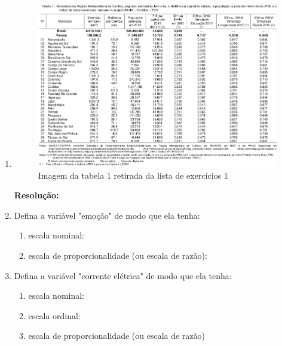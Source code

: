 \begin{enumerate}[label=\emph{\arabic*})]
	\item
	      \begin{figure}[h]
		      \centering
		      \includegraphics[width=\linewidth]{"fig/imagem da tabela 1"}
		      \caption[Imagem da tabela 1]{Imagem da tabela 1 retirada da lista de exercícios 1}
		      \label{fig:imagem-da-tabela-1}
	      \end{figure}

	      \textbf{Resolução:}

	\item Defina a variável "emoção" de modo que ela tenha:

	      \begin{enumerate}[label=\emph{\alph*})]

		      \item escala nominal:

		      \item escala de proporcionalidade (ou escala de razão):

	      \end{enumerate}

	\item Defina a variável "corrente elétrica" de modo que ela tenha:

	      \begin{enumerate}[label=\emph{\alph*})]

		      \item escala nominal:

		      \item escala ordinal:

		      \item escala de proporcionalidade (ou escala de razão)


\end{enumerate}
\end{enumerate}
